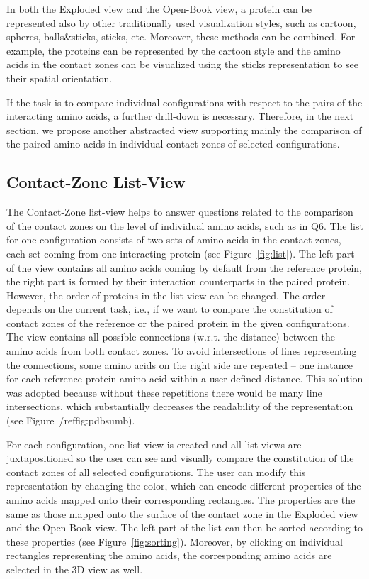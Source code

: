 \documentclass{bmcart}
\def\OpBook {Open-Book view\xspace}
\def\ExpView {Exploded view\xspace}
\def\CoZoListView {Contact-Zone list-view\xspace}
\begin{document}
In both the \ExpView and the \OpBook, a protein can be represented also by other traditionally used visualization styles, such as cartoon, spheres, balls\&sticks, sticks, etc.
Moreover, these methods can be combined. 
For example, the proteins can be represented by the cartoon style and the amino acids in the contact zones can be visualized using the sticks representation to see their spatial orientation.%

If the task is to compare individual configurations with respect to the pairs of the interacting amino acids, a further drill-down is necessary.
Therefore, in the next section, we propose another abstracted view supporting mainly the comparison of the paired amino acids in individual contact zones of selected configurations.


\subsection*{Contact-Zone List-View}
The \CoZoListView helps to answer questions related to the comparison of the contact zones on the level of individual amino acids, such as in Q6.
The list for one configuration consists of two sets of amino acids in the contact zones, each set coming from one interacting protein (see Figure~\ref{fig:list}).
The left part of the view contains all amino acids coming by default from the reference protein, the right part is formed by their interaction counterparts in the paired protein.
However, the order of proteins in the list-view can be changed.
The order depends on the current task, i.e., if we want to compare the constitution of contact zones of the reference or the paired protein in the given configurations.
The view contains all possible connections (w.r.t. the distance) between the amino acids from both contact zones.
To avoid intersections of lines representing the connections, some amino acids on the right side are repeated -- one instance for each reference protein amino acid within a user-defined distance. 
This solution was adopted because without these repetitions there would be many line intersections, which substantially decreases the readability of the representation (see Figure~/ref{fig:pdbsum}b).

For each configuration, one list-view is created and all list-views are juxtapositioned so the user can see and visually compare the constitution of the contact zones of all selected configurations.
The user can modify this representation by changing the color, which can encode different properties of the amino acids mapped onto their corresponding rectangles.
The properties are the same as those mapped onto the surface of the contact zone in the Exploded view and the Open-Book view.
The left part of the list can then be sorted according to these properties (see Figure~\ref{fig:sorting}).
Moreover, by clicking on individual rectangles representing the amino acids, the corresponding amino acids are selected in the 3D view as well.
\end{document}
